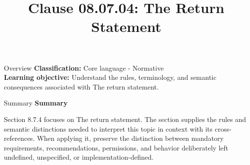 \documentclass[10pt,letterpaper]{article}
\title{Clause 08.07.04: The Return Statement}
\author{}
\date{}
\begin{document}
\maketitle
\begin{CornellOverviewBox}{Overview}
\textbf{Classification:} Core language - Normative\\[2pt]
\textbf{Learning objective:} Understand the rules, terminology, and semantic consequences associated with The return statement.
\end{CornellOverviewBox}\begin{CornellSummaryBox}{Summary}
{\sffamily\bfseries\color{Accent} Summary}\par\vspace{3pt}Section 8.7.4 focuses on The return statement. The section supplies the rules and semantic distinctions needed to interpret this topic in context with its cross-references. When applying it, preserve the distinction between mandatory requirements, recommendations, permissions, and behavior deliberately left undefined, unspecified, or implementation-defined.
\end{CornellSummaryBox}
\end{document}
